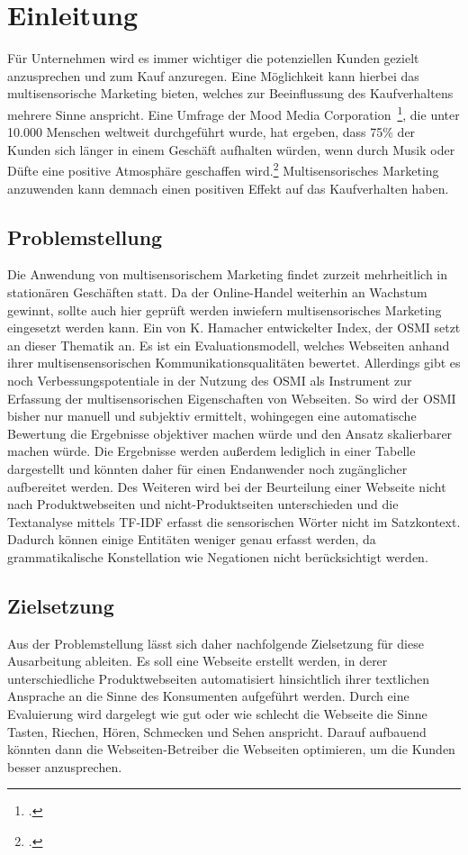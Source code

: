 \section{Einleitung}
Für Unternehmen wird es immer wichtiger die potenziellen Kunden gezielt anzusprechen und zum Kauf anzuregen. Eine Möglichkeit kann hierbei das multisensorische Marketing bieten, welches zur Beeinflussung des Kaufverhaltens mehrere Sinne anspricht.
Eine Umfrage der Mood Media Corporation~\footcite[\vglf][]{steiner2022}, die unter 10.000 Menschen weltweit durchgeführt wurde, hat ergeben, dass 75\% der Kunden sich länger in einem Geschäft aufhalten würden, wenn durch Musik oder Düfte eine positive Atmosphäre geschaffen wird.\footcite[\vglf][]{moodmedia2019}
Multisensorisches Marketing anzuwenden kann demnach einen positiven Effekt auf das Kaufverhalten haben.

\subsection{Problemstellung}
Die Anwendung von multisensorischem Marketing findet zurzeit mehrheitlich in stationären Geschäften statt. Da der Online-Handel weiterhin an Wachstum gewinnt, sollte auch hier geprüft werden inwiefern multisensorisches Marketing eingesetzt werden kann.
Ein von K. Hamacher entwickelter Index, der \acf{OSMI} setzt an dieser Thematik an. Es ist ein Evaluationsmodell, welches Webseiten anhand ihrer
multisensensorischen Kommunikationsqualitäten bewertet. Allerdings gibt es noch Verbessungspotentiale in der Nutzung des \ac{OSMI} als Instrument zur Erfassung der multisensorischen Eigenschaften von Webseiten. So wird der \acl{OSMI} bisher nur manuell und subjektiv ermittelt, wohingegen eine automatische Bewertung die Ergebnisse objektiver machen würde und den Ansatz skalierbarer machen würde.
Die Ergebnisse werden außerdem lediglich in einer Tabelle dargestellt und könnten daher für einen Endanwender noch zugänglicher aufbereitet werden.
Des Weiteren wird bei der Beurteilung einer Webseite nicht nach Produktwebseiten und nicht-Produktseiten unterschieden und die Textanalyse mittels \ac{TF-IDF} erfasst die sensorischen Wörter nicht im Satzkontext. Dadurch können einige Entitäten weniger genau erfasst werden, da grammatikalische Konstellation wie Negationen nicht berücksichtigt werden.

\subsection{Zielsetzung}
Aus der Problemstellung lässt sich daher nachfolgende Zielsetzung für diese Ausarbeitung ableiten. Es soll eine Webseite erstellt werden, in derer unterschiedliche Produktwebseiten automatisiert hinsichtlich ihrer textlichen Ansprache an die Sinne des Konsumenten aufgeführt werden.
Durch eine Evaluierung wird dargelegt wie gut oder wie schlecht die Webseite die Sinne Tasten, Riechen, Hören, Schmecken und Sehen anspricht.
Darauf aufbauend könnten dann die Webseiten-Betreiber die Webseiten optimieren, um die Kunden besser anzusprechen.

